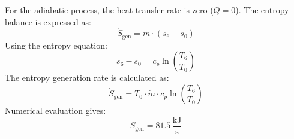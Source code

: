 For the adiabatic process, the heat transfer rate is zero (\( \dot{Q} = 0 \)).  
The entropy balance is expressed as:  
\[
\dot{S}_{\text{gen}} = \dot{m} \cdot (s_6 - s_0)
\]  
Using the entropy equation:  
\[
s_6 - s_0 = c_p \ln \left(\frac{T_6}{T_0}\right)
\]  
The entropy generation rate is calculated as:  
\[
\dot{S}_{\text{gen}} = T_0 \cdot \dot{m} \cdot c_p \ln \left(\frac{T_6}{T_0}\right)
\]  
Numerical evaluation gives:  
\[
\dot{S}_{\text{gen}} = 81.5 \, \frac{\text{kJ}}{\text{s}}
\]